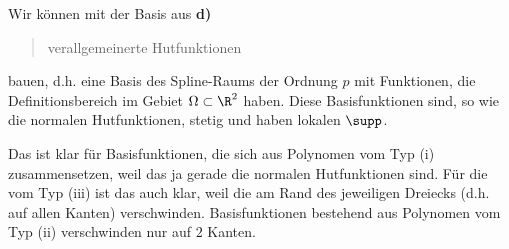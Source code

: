 \begin{solution}
\begin{enumerate}[label = \textbf{\alph*)}]
  \begin{comment}

  Ganz Allgemein:

  Sei $B$ eine Polynombasis von $P_p$, und $n := \dim P_p = |B|$.
  Seien $(x_1, y_1), \dots, (x_n, y_n) \in \K^2$ paarweise verschiedene Interpolations-Knoten und $p(x_1, y_1), \dots, p(x_n, y_n) \in \K$ Interpolations-Werte.
  Durch ein lineares Gleichungssystem mit Vandermonde-Matrix bzgl. $B$ und $(x_1, y_1), \dots, (x_n, y_n)$ als linke Seite und $(p(x_1, y_1), \dots, p(x_n, y_n))^T$ als rechte Seite, können wir die Koeffizienten eines eindeutigen Polynoms $p \in P_p$ finden, dass an den Interpolations-Knoten die gewünschten Interpolations-Werte annimmt. \\

  In unserem Fall:

  Wenn wir in Proposition 3.1 von Ordnung $p$ nach $p + 1$ gehen, dann müssen wir $p + 1$ Interpolations-Knoten (aus dem Dreieck) und -Werte hinzufügen.

  Wir wollen, dass unser (durch die lokale Interpolation auf den Dreiecken zusammengesetzter) Spline stetig ist.
  Außerhalb der Kanten ist das immer der Fall.
  Auf den Kanten müssten die angrenzenden Interpolations-Polynome übereinstimmen.

  Das erzielen wir, indem wir beim Ordnungs-Übergang zu jeder Kante genau einen Interpolations-Knoten hinzufügen.
  (Den Rest packen wir ins Innere der Dreiecke.)
  Für jede Kante sind die darauf eingeschränkten Interpolations-Polynome eindeutig bestimmt.
  Insbesondere stimmen angrenzende Polynome darauf überein.

  \end{comment}

  Wir können mit der Basis aus \textbf{d)} \blockquote{verallgemeinerte Hutfunktionen} bauen, d.h. eine Basis des Spline-Raums der Ordnung $p$ mit Funktionen, die Definitionsbereich im Gebiet $\Omega \subset \R^2$ haben.
  Diese Basisfunktionen sind, so wie die normalen Hutfunktionen, stetig und haben lokalen $\supp$.

  Das ist klar für Basisfunktionen, die sich aus Polynomen vom Typ (i) zusammensetzen, weil das ja gerade die normalen Hutfunktionen sind.
  Für die vom Typ (iii) ist das auch klar, weil die am Rand des jeweiligen Dreiecks (d.h. auf allen Kanten) verschwinden.
  Basisfunktionen bestehend aus Polynomen vom Typ (ii) verschwinden nur auf $2$ Kanten.


\end{enumerate}
\end{solution}
